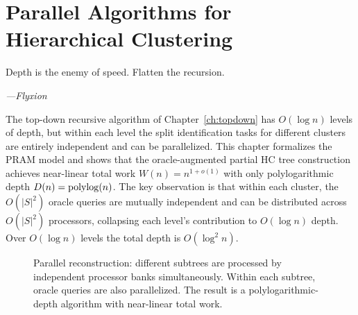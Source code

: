 \chapter{Parallel Algorithms for Hierarchical Clustering}
\label{ch:parallel}

\epigraph{%
  Depth is the enemy of speed. Flatten the recursion.%
}{\textit{---Flyxion}}

The top-down recursive algorithm of Chapter~\ref{ch:topdown} has $O(\log n)$ levels of depth, but within each level the split identification tasks for different clusters are entirely independent and can be parallelized. This chapter formalizes the PRAM model and shows that the oracle-augmented partial HC tree construction achieves near-linear total work $W(n) = n^{1+o(1)}$ with only polylogarithmic depth $D(n) = \operatorname{polylog}(n)$. The key observation is that within each cluster, the $O(|S|^2)$ oracle queries are mutually independent and can be distributed across $O(|S|^2)$ processors, collapsing each level's contribution to $O(\log n)$ depth. Over $O(\log n)$ levels the total depth is $O(\log^2 n)$.

\begin{figure}[ht]
\centering
{}
\caption{Parallel reconstruction: different subtrees are processed by independent processor banks simultaneously. Within each subtree, oracle queries are also parallelized. The result is a polylogarithmic-depth algorithm with near-linear total work.}
\label{fig:parallel}
\end{figure}

